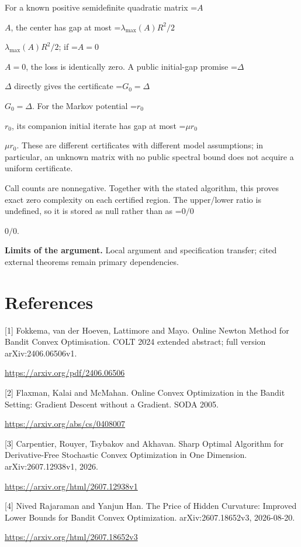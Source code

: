 \documentclass[10pt,a4paper]{article}
\newcommand{\AtlasMath}[1]{\par\begingroup\centering\setbox0=\hbox{$\displaystyle #1$}\ifdim\wd0>1.4\linewidth\typeout{ATLAS WIDE FORMULA: \the\wd0}\fi\ifdim\wd0>\linewidth\resizebox{\linewidth}{!}{\box0}\else\box0\fi\par\endgroup}
\newcommand{\AtlasInlineMath}[1]{\begingroup\setbox0=\hbox{$#1$}\ifdim\wd0>.4\linewidth\endgroup\AtlasMath{#1}\else\endgroup$#1$\fi}
\begin{document}
For a known positive semidefinite quadratic matrix \AtlasInlineMath{A}, the center has gap at most \AtlasInlineMath{\lambda_{\max}(A)R^2/2}; if \AtlasInlineMath{A=0}, the loss is identically zero. A public initial-gap promise \AtlasInlineMath{\Delta} directly gives the certificate \AtlasInlineMath{G_0=\Delta}. For the Markov potential \AtlasInlineMath{r_0}, its companion initial iterate has gap at most \AtlasInlineMath{\mu r_0}. These are different certificates with different model assumptions; in particular, an unknown matrix with no public spectral bound does not acquire a uniform certificate.

Call counts are nonnegative. Together with the stated algorithm, this proves exact zero complexity on each certified region. The upper/lower ratio is undefined, so it is stored as null rather than as \AtlasInlineMath{0/0}.

\textbf{Limits of the argument.} Local argument and specification transfer; cited external theorems remain primary dependencies.

\section{References}
[1] Fokkema, van der Hoeven, Lattimore and Mayo. Online Newton Method for Bandit Convex Optimisation. COLT 2024 extended abstract; full version arXiv:2406.06506v1.

\url{https://arxiv.org/pdf/2406.06506}

[2] Flaxman, Kalai and McMahan. Online Convex Optimization in the Bandit Setting: Gradient Descent without a Gradient. SODA 2005.

\url{https://arxiv.org/abs/cs/0408007}

[3] Carpentier, Rouyer, Tsybakov and Akhavan. Sharp Optimal Algorithm for Derivative-Free Stochastic Convex Optimization in One Dimension. arXiv:2607.12938v1, 2026.

\url{https://arxiv.org/html/2607.12938v1}

[4] Nived Rajaraman and Yanjun Han. The Price of Hidden Curvature: Improved Lower Bounds for Bandit Convex Optimization. arXiv:2607.18652v3, 2026-08-20.

\url{https://arxiv.org/html/2607.18652v3}
\end{document}
